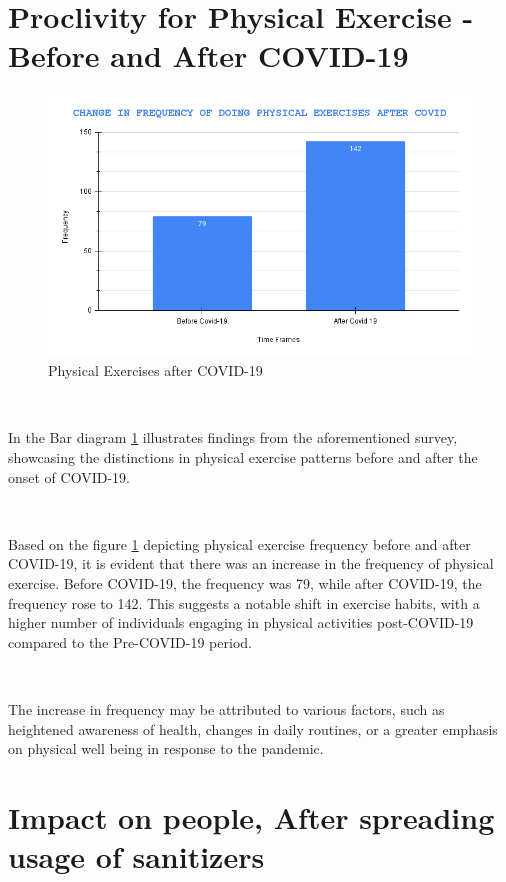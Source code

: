 \section{Proclivity for Physical Exercise - Before and After COVID-19}

\begin{figure}[h!]
	\centering
	\includegraphics[width=0.9\linewidth]{IMAGES/Image 35.png}
	\caption{Physical Exercises after COVID-19}
	\label{G35}
\end{figure}

\ 

In the Bar diagram \ref{G35} illustrates findings from the aforementioned survey, showcasing the distinctions in physical exercise patterns before and after the onset of COVID-19. 

\

Based on the figure \ref{G35} depicting physical exercise frequency before and after COVID-19, it is evident that there was an increase in the frequency of physical exercise. Before COVID-19, the frequency was 79, while after COVID-19, the frequency rose to 142. This suggests a notable shift in exercise habits, with a higher number of individuals engaging in physical activities post-COVID-19 compared to the Pre-COVID-19 period. 

\

The increase in frequency may be attributed to various factors, such as heightened awareness of health, changes in daily routines, or a greater emphasis on physical well
being in response to the pandemic. 

\section{Impact on people, After spreading usage of sanitizers}

